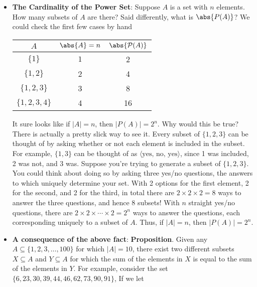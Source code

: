 \documentclass{report}
\begin{document}
\begin{itemize}
        \item \textbf{The Cardinality of the Power Set}: Suppose $A$ is a set with $n$ elements. How many subsets of $A$ are there? Said differently, what is $\abs{P(A)}$?
            \bigbreak \noindent 
            We could check the first few cases by hand
            \begin{center}
                \begin{tabular}{c|c|c}
                    $A$& $\abs{A} = n$ & $\abs{\mathcal{P}(A)}$ \\
                    \hline
                    $\{1\}$ & $1$ & 2 \\
                    $\{1,2\}$ & 2 & 4 \\
                    $\{1,2,3\}$ & 3 & 8 \\
                    $\{1,2,3,4\}$ & 4 & 16
                \end{tabular}
            \end{center}
            \bigbreak \noindent 
            It sure looks like if $|A| = n$, then $|P(A)| = 2^n$.  Why would this be true? There is actually a pretty slick way to see it. Every subset  of $\{1, 2, 3\}$ can be thought of by asking whether or not each element is included in the  subset. For example, $\{1, 3\}$ can be thought of as $\langle \text{yes, no, yes} \rangle$, since 1 was included,  2 was not, and 3 was.
            \bigbreak \noindent 
            Suppose you’re trying to generate a subset of $\{1, 2, 3\}$. You could think about  doing so by asking three yes/no questions, the answers to which uniquely determine  your set. With 2 options for the first element, 2 for the second, and 2 for the third, in  total there are $2 \times 2 \times 2 = 8$ ways to answer the three questions, and hence 8 subsets!
            \bigbreak \noindent 
            With $n$ straight yes/no questions, there are $2 \times 2 \times \cdots \times 2 = 2^n$ ways to answer  the questions, each corresponding uniquely to a subset of $A$. Thus, if $|A| = n$, then  $|P(A)| = 2^n$.
        \item \textbf{A consequence of the above fact}:
            \bigbreak \noindent 
            \textbf{Proposition}. Given any $A \subseteq \{1, 2, 3, \ldots, 100\}$ for which $|A| = 10$, there  exist two different subsets $X \subseteq A$ and $Y \subseteq A$ for which the sum of the elements  in $X$ is equal to the sum of the elements in $Y$.
            \bigbreak \noindent 
            For example, consider the set $\{6, 23, 30, 39, 44, 46, 62, 73, 90, 91\}$, If we let 
            \begin{align*}

\end{align*}
\end{itemize}
\end{document}
